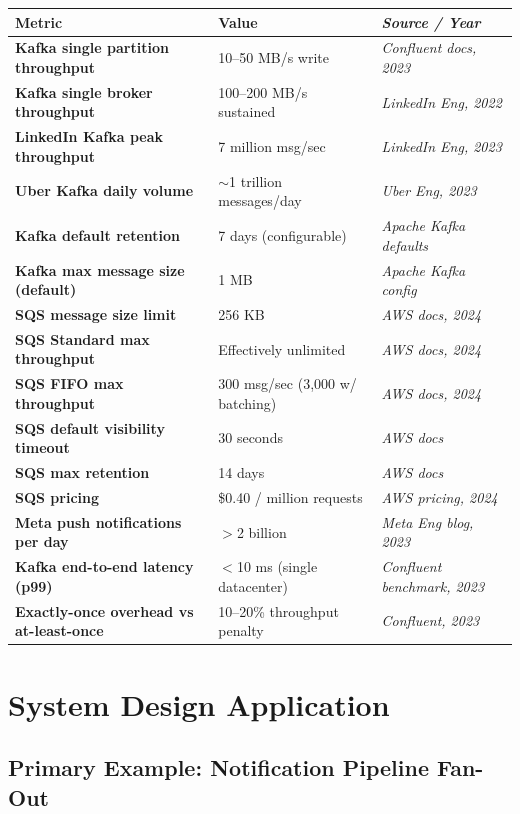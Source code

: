 \documentclass[11pt,a4paper]{article}
\begin{document}
\begin{center}
\renewcommand{\arraystretch}{1.5}
\begin{tabularx}{\textwidth}{>{\bfseries\small}p{5.5cm} >{\small}p{3.5cm} >{\small\itshape}X}
  \toprule
  \small\textbf{Metric} & \small\textbf{Value} & \small\textbf{Source / Year} \\
  \midrule
  Kafka single partition throughput & 10--50 MB/s write & Confluent docs, 2023 \\
  Kafka single broker throughput & 100--200 MB/s sustained & LinkedIn Eng, 2022 \\
  LinkedIn Kafka peak throughput & 7 million msg/sec & LinkedIn Eng, 2023 \\
  Uber Kafka daily volume & $\sim$1 trillion messages/day & Uber Eng, 2023 \\
  Kafka default retention & 7 days (configurable) & Apache Kafka defaults \\
  Kafka max message size (default) & 1 MB & Apache Kafka config \\
  SQS message size limit & 256 KB & AWS docs, 2024 \\
  SQS Standard max throughput & Effectively unlimited & AWS docs, 2024 \\
  SQS FIFO max throughput & 300 msg/sec (3,000 w/ batching) & AWS docs, 2024 \\
  SQS default visibility timeout & 30 seconds & AWS docs \\
  SQS max retention & 14 days & AWS docs \\
  SQS pricing & \$0.40 / million requests & AWS pricing, 2024 \\
  Meta push notifications per day & $>$2 billion & Meta Eng blog, 2023 \\
  Kafka end-to-end latency (p99) & $<$10 ms (single datacenter) & Confluent benchmark, 2023 \\
  Exactly-once overhead vs at-least-once & 10--20\% throughput penalty & Confluent, 2023 \\
  \bottomrule
\end{tabularx}
\end{center}

\section{System Design Application}

\subsection{Primary Example: Notification Pipeline Fan-Out}
\end{document}
